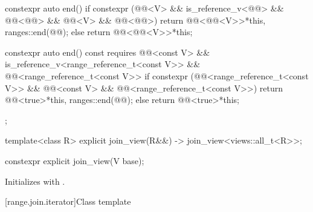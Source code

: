 \begin{codeblock}
{{    constexpr auto end() {
      if constexpr (@@<V> &&
                    is_reference_v<@@> && @@<@@> &&
                    @@<V> && @@<@@>)
        return @@<@@<V>>{*this, ranges::end(@@)};
      else
        return @@<@@<V>>{*this};
    }

    constexpr auto end() const
      requires @@<const V> &&
               is_reference_v<range_reference_t<const V>> &&
               @@<range_reference_t<const V>> {
      if constexpr (@@<range_reference_t<const V>> &&
                    @@<const V> &&
                    @@<range_reference_t<const V>>)
        return @@<true>{*this, ranges::end(@@)};
      else
        return @@<true>{*this};
    }
  };

  template<class R>
    explicit join_view(R&&) -> join_view<views::all_t<R>>;
}
\end{codeblock}

%
\begin{itemdecl}
constexpr explicit join_view(V base);
\end{itemdecl}

\begin{itemdescr}
\pnum
\effects
Initializes  with .
\end{itemdescr}

[range.join.iterator]{Class template }

